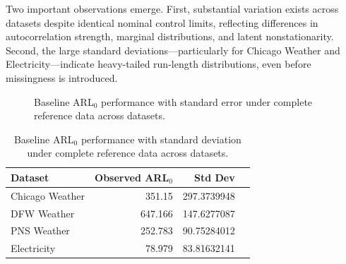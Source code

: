 Two important observations emerge. First, substantial variation exists across datasets despite identical nominal control limits, reflecting differences in autocorrelation strength, marginal distributions, and latent nonstationarity. Second, the large standard deviations—particularly for Chicago Weather and Electricity—indicate heavy-tailed run-length distributions, even before missingness is introduced.  

\begin{figure}[H]
\centering
\caption{Baseline ARL$_0$ performance with standard error under complete reference data across datasets.}
\label{fig:baseline_arl0}

\end{figure}


\begin{table}[H]
\centering
\caption{Baseline \ac{ARL}$_0$ performance with standard deviation under complete reference data across datasets.}
\label{tab:baseline_arl0}
\begin{tabular}{lrrr}
\toprule
\textbf{Dataset}  & \textbf{Observed \ac{ARL}$_0$} & \textbf{Std Dev} \\
\midrule
Chicago Weather & 351.15 & 297.3739948 \\
DFW Weather & 647.166 & 147.6277087 \\
PNS Weather & 252.783 & 90.75284012 \\
Electricity & 78.979 & 83.81632141 \\
\bottomrule
\end{tabular}
\end{table}

